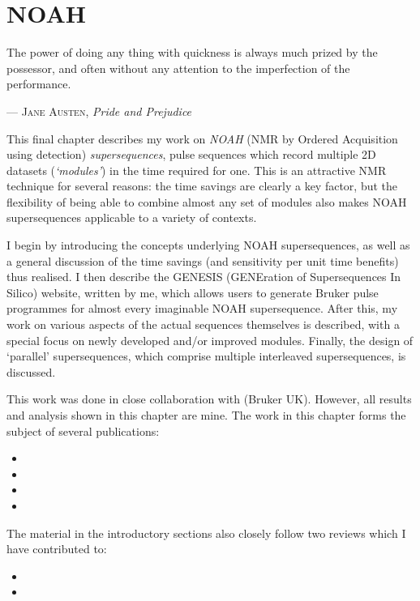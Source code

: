 \chapter{NOAH}
\label{chpt:noah}

\epigraph{\singlespacing%
The power of doing any thing with quickness is always much prized by the possessor, and often without any attention to the imperfection of the performance.%
}{--- \textsc{Jane Austen}, \textit{Pride and Prejudice}}

This final chapter describes my work on \textit{NOAH} (NMR by Ordered Acquisition using \proton{} detection) \textit{supersequences}, pulse sequences which record multiple 2D datasets (\textit{`modules'}) in the time required for one.
This is an attractive NMR technique for several reasons: the time savings are clearly a key factor, but the flexibility of being able to combine almost any set of modules also makes NOAH supersequences applicable to a variety of contexts.

I begin by introducing the concepts underlying NOAH supersequences, as well as a general discussion of the time savings (and sensitivity per unit time benefits) thus realised.
I then describe the GENESIS (GENEration of Supersequences In Silico) website, written by me, which allows users to generate Bruker pulse programmes for almost every imaginable NOAH supersequence.
After this, my work on various aspects of the actual sequences themselves is described, with a special focus on newly developed and/or improved modules.
Finally, the design of `parallel' supersequences, which comprise multiple interleaved supersequences, is discussed.

This work was done in close collaboration with \EK{} (Bruker UK).
However, all results and analysis shown in this chapter are mine.
The work in this chapter forms the subject of several publications:

\begin{itemize}
    \item {}
    \item {}
    \item {}
    \item {}
\end{itemize}

The material in the introductory sections also closely follow two reviews which I have contributed to:
\begin{itemize}
    \item {}
    \item {}
\end{itemize}

\clearpage








\printbibliography[heading=subbibnumbered]{}
